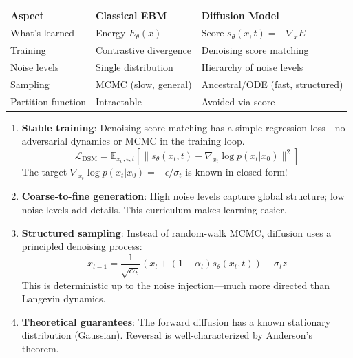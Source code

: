 \begin{remark}\leavevmode
    \begin{center}
    \begin{tabular}{lll}
        \hline
        \textbf{Aspect} & \textbf{Classical EBM} & \textbf{Diffusion Model} \\
        \hline
        What's learned & Energy $E_\theta(x)$ & Score $s_\theta(x, t) = -\nabla_x E$ \\
        Training & Contrastive divergence & Denoising score matching \\
        Noise levels & Single distribution & Hierarchy of noise levels \\
        Sampling & MCMC (slow, general) & Ancestral/ODE (fast, structured) \\
        Partition function & Intractable & Avoided via score \\
        \hline
    \end{tabular}
    \end{center}
\end{remark}

\begin{remark}\leavevmode
    \begin{enumerate}
        \item \textbf{Stable training}: Denoising score matching has a simple regression loss---no adversarial dynamics or MCMC in the training loop.
        \[
            \mathcal{L}_{\text{DSM}} = \mathbb{E}_{x_0, \epsilon, t}\left[ \| s_\theta(x_t, t) - \nabla_{x_t} \log p(x_t | x_0) \|^2 \right]
        \]
        The target $\nabla_{x_t} \log p(x_t | x_0) = -\epsilon / \sigma_t$ is known in closed form!

        \item \textbf{Coarse-to-fine generation}: High noise levels capture global structure; low noise levels add details. This curriculum makes learning easier.

        \item \textbf{Structured sampling}: Instead of random-walk MCMC, diffusion uses a principled denoising process:
        \[
            x_{t-1} = \frac{1}{\sqrt{\alpha_t}}\left( x_t + (1 - \alpha_t) s_\theta(x_t, t) \right) + \sigma_t z
        \]
        This is deterministic up to the noise injection---much more directed than Langevin dynamics.

        \item \textbf{Theoretical guarantees}: The forward diffusion has a known stationary distribution (Gaussian). Reversal is well-characterized by Anderson's theorem.
    \end{enumerate}
\end{remark}


